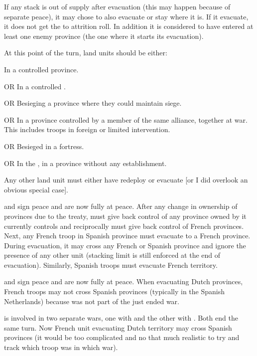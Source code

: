  If any stack is out of supply after
evacuation (this may happen because of separate peace), it may chose to also
evacuate or stay where it is.
\bparag If it evacuate, it does not get the  to attrition roll. In
addition it is considered to have entered at least one enemy province (the one
where it starts its evacuation).

\aparag[Memento]
\bparag At this point of the turn, land units should be either:
\begin{modlist}
\item In a controlled province.
\item[OR] In a controlled \Presidio.
\item[OR] Besieging a province where they could maintain siege.
\item[OR] In a province controlled by a member of the same alliance, together
  at war. This includes troops in foreign or limited intervention.
\item[OR] Besieged in a fortress.
\item[OR] In the \ROTW, in a province without any establishment.
\end{modlist}
\bparag Any other land unit must either have redeploy or evacuate [or I did
overlook an obvious special case].

\begin{exemple}
  \FRA and \HIS sign peace and are now fully at peace. After any change in
  ownership of provinces due to the treaty, \FRA must give back control of any
  province owned by \HIS it currently controls and reciprocally \HIS must give
  back control of French provinces. Next, any French troop in Spanish province
  must evacuate to a French province. During evacuation, it may cross any
  French or Spanish province and ignore the presence of any other unit
  (stacking limit is still enforced at the end of evacuation). Similarly,
  Spanish troops must evacuate French territory.
\end{exemple}

\begin{exemple}
  \FRA and \HOL sign peace and are now fully at peace. When evacuating Dutch
  provinces, French troops may not cross Spanish provinces (typically in the
  Spanish Netherlands) because \HIS was not part of the just ended war.

  \smallskip

  \FRA is involved in two separate wars, one with \HIS and the other with
  \HOL. Both end the same turn. Now French unit evacuating Dutch territory may
  cross Spanish provinces (it would be too complicated and no that much
  realistic to try and track which troop was in which war).
\end{exemple}


